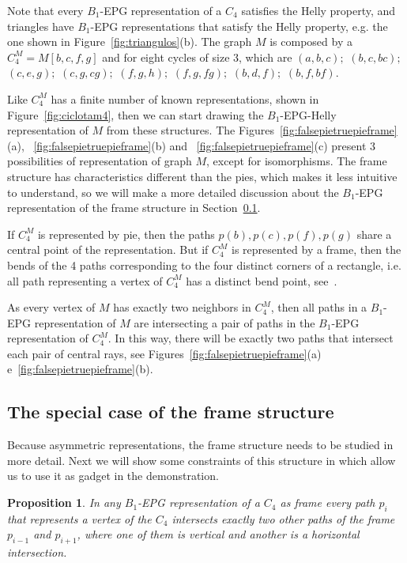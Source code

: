 \documentclass[a4paper,11pt]{article}
\newtheorem{prop}[theorem]{Proposition}
\begin{document}
Note that every $B_1$-EPG representation of a $C_4$ satisfies the Helly property, and triangles have $B_1$-EPG representations that satisfy the Helly property, e.g. the one shown in Figure~\ref{fig:triangulos}(b). The graph $M$ is composed by a $C_4^M=M[b, c, f, g]$ and for eight cycles of size 3, which are $(a,b,c);$ $(b,c,bc);$ $(c,e,g);$ $(c,g,cg);$ $(f,g,h);$ $(f,g,fg);$ $(b,d,f);$ $(b,f,bf).$

Like $C_4^M$ has a finite number of known representations, shown in Figure~\ref{fig:ciclotam4}, then we can start drawing the $B_{1}$-EPG-Helly representation of $M$ from these structures. The Figures~\ref{fig:falsepietruepieframe}(a), ~\ref{fig:falsepietruepieframe}(b) and ~\ref{fig:falsepietruepieframe}(c) present 3 possibilities of representation of graph $M$, except for isomorphisms. The frame structure has characteristics different than the pies, which makes it less intuitive to understand, so we will make a more detailed discussion about the $B_1$-EPG representation of the frame structure in Section~\ref{subsec:moldura}.

If $C_4^M$ is represented by pie, then the paths $p(b), p(c), p(f), p(g)$ share a central point of the representation. But if $C_4^M$ is represented by a frame, then the bends of the 4 paths corresponding to the four distinct corners of a rectangle, i.e. all path representing a vertex of $C_4^M$ has a distinct bend point, see~\citep{golumbic2009}.

As every vertex of $M$ has exactly two neighbors in $C_4^M $, then all paths in a $B_1$-EPG representation of $M$ are intersecting a pair of paths in the $B_1$-EPG representation of $C_4^M$. In this way, there will be exactly two paths that intersect each pair of central rays, see Figures~\ref{fig:falsepietruepieframe}(a) e~\ref{fig:falsepietruepieframe}(b). 

\subsection{The special case of the frame structure} \label{subsec:moldura}

Because asymmetric representations, the frame structure needs to be studied in more detail. Next we will show some constraints of this structure in which allow us to use it as gadget in the demonstration.

\begin{prop}\label{lem:direcoesdiferentes}
In any $B_1$-EPG representation of a $C_4$ as frame every path $p_i$ that represents a vertex of the $C_4$ intersects exactly two other paths of the frame $p_{i-1}$ and $p_{i+1}$, where one of them is vertical and another is a horizontal intersection.
\end{prop}
\end{document}
